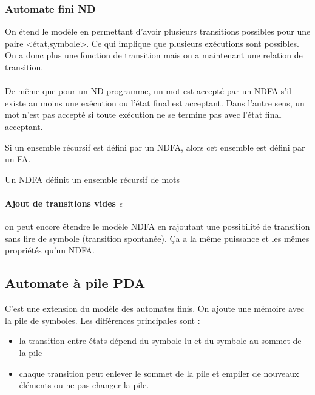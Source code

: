 \subsubsection{Automate fini ND}
\label{ssub:automate_fini_nd}
On étend le modèle en permettant d'avoir plusieurs transitions possibles pour 
une paire <état,symbole>. Ce qui implique que plusieurs exécutions sont 
possibles. On a donc plus une fonction de transition mais on a maintenant une
relation de transition.

\paragraph{} De même que pour un ND programme, un mot est accepté par un NDFA 
s’il existe au moins une exécution ou l'état final est acceptant. Dans l'autre 
sens, un 
mot n'est pas accepté si toute exécution ne se termine pas avec l'état final 
acceptant.

\begin{myprop}
	Si un ensemble récursif est défini par un NDFA, alors cet ensemble est 
	défini par un FA.
\end{myprop}

\begin{myprop}
	Un NDFA définit un ensemble récursif de mots
\end{myprop}

\paragraph{Ajout de transitions vides $\epsilon$} on peut encore étendre le modèle NDFA en 
rajoutant une possibilité de transition sans lire de symbole (transition 
spontanée). Ça a la même puissance et les mêmes propriétés qu'un NDFA.


\subsection{Automate à pile PDA}
\label{sub:automate_pile}
C'est une extension du modèle des automates finis. On ajoute une mémoire avec 
la pile de symboles.
Les différences principales sont :
\begin{itemize}
	\item la transition entre états dépend du symbole lu et du symbole au 
		sommet de la pile
	\item	chaque transition peut enlever le sommet de la pile et empiler 
		de nouveaux éléments ou ne pas changer la pile.
\end{itemize}

